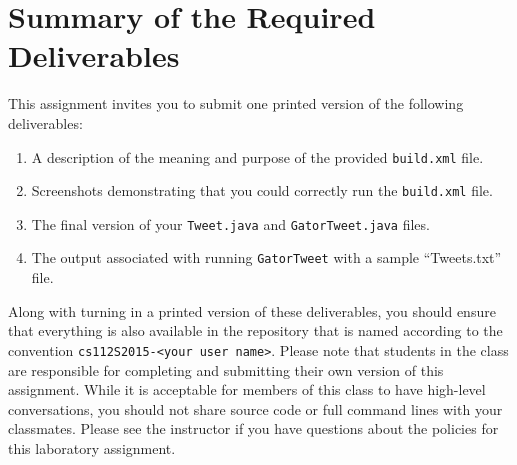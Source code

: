 \section*{Summary of the Required Deliverables}

  This assignment invites you to submit one printed version of the following deliverables: 

  \begin{enumerate} 
    \item A description of the meaning and purpose of the provided {\tt build.xml} file.
    
    \item Screenshots demonstrating that you could correctly run the {\tt build.xml} file.
    
    \item The final version of your {\tt Tweet.java} and {\tt GatorTweet.java} files.
    
    \item The output associated with running {\tt GatorTweet} with a sample ``Tweets.txt'' file. 
  
  \end{enumerate}

  Along with turning in a printed version of these deliverables, you should ensure that everything is also available in
  the repository that is named according to the convention {\tt cs112S2015-<your user name>}. Please note that students
  in the class are responsible for completing and submitting their own version of this assignment.    While it is
  acceptable for members of this class to have high-level conversations, you should not share source code or full
  command lines with your classmates.  Please see the instructor if you have questions about the policies for this
  laboratory assignment.

  
